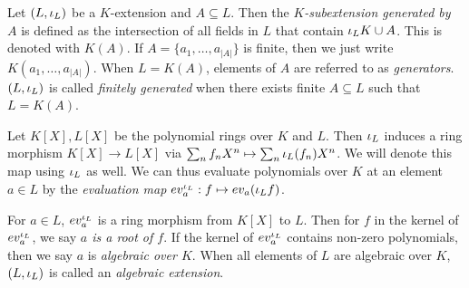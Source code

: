 \documentclass[main.tex]{subfiles}
\begin{document}
\begin{dfn} 
  
  Let $(L,\iota_L)$ be a $K$-extension and $A \subseteq L$. 
  Then the \emph{$K$-subextension generated by $A$} is defined as 
  the intersection of all fields in $L$ that contain $\iota_L K \cup A$.
  This is denoted with $K(A)$.  
  If $A = \{a_1,\dots,a_{|A|}\}$ is finite, 
  then we just write $K(a_1,\dots,a_{|A|})$. 
  When $L = K(A)$, elements of $A$ are referred to as \emph{generators}. 
  $(L,\iota_L)$ is called \emph{finitely generated} when 
  there exists finite $A \subseteq L$ such that $L = K(A)$. 

  Let $K[X], L[X]$ be the polynomial rings over $K$ and $L$. 
  Then $\iota_L$ induces a ring morphism $K[X] \to L[X]$
  via $\sum_{n} f_n X^n \mapsto \sum_{n} \iota_L(f_n) X^n$. 
  We will denote this map using $\iota_L$ as well. 
  We can thus evaluate polynomials over $K$ at an element $a \in L$ 
  by the \emph{evaluation map} 
  $ev_a^{\iota_L} : f \mapsto ev_a (\iota_L f)$. 

  For $a \in L$, $ev_a^{\iota_L}$ is a ring morphism from $K[X]$ to $L$. 
  Then for $f$ in the kernel of $ev_a^{\iota_L}$, 
  we say \emph{$a$ is a root of $f$}. 
  If the kernel of $ev_a^{\iota_L}$ contains non-zero polynomials, 
  then we say $a$ is \emph{algebraic over $K$}. 
  When all elements of $L$ are algebraic over $K$, 
  $(L,\iota_L)$ is called an \emph{algebraic extension}.
\end{dfn}
\end{document}
